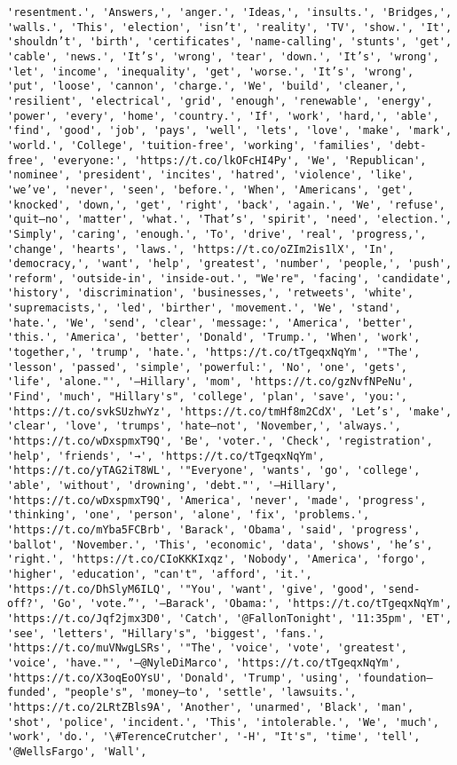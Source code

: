 \documentclass[11pt]{article}
\begin{document}
\begin{Verbatim}[commandchars=\\\{\}]
'resentment.', 'Answers,', 'anger.', 'Ideas,', 'insults.', 'Bridges,', 'walls.', 'This', 'election', 'isn’t', 'reality', 'TV', 'show.', 'It', 'shouldn’t', 'birth', 'certificates', 'name-calling', 'stunts', 'get', 'cable', 'news.', 'It’s', 'wrong', 'tear', 'down.', 'It’s', 'wrong', 'let', 'income', 'inequality', 'get', 'worse.', 'It’s', 'wrong', 'put', 'loose', 'cannon', 'charge.', 'We', 'build', 'cleaner,', 'resilient', 'electrical', 'grid', 'enough', 'renewable', 'energy', 'power', 'every', 'home', 'country.', 'If', 'work', 'hard,', 'able', 'find', 'good', 'job', 'pays', 'well', 'lets', 'love', 'make', 'mark', 'world.', 'College', 'tuition-free', 'working', 'families', 'debt-free', 'everyone:', 'https://t.co/lkOFcHI4Py', 'We', 'Republican', 'nominee', 'president', 'incites', 'hatred', 'violence', 'like', 'we’ve', 'never', 'seen', 'before.', 'When', 'Americans', 'get', 'knocked', 'down,', 'get', 'right', 'back', 'again.', 'We', 'refuse', 'quit—no', 'matter', 'what.', 'That’s', 'spirit', 'need', 'election.', 'Simply', 'caring', 'enough.', 'To', 'drive', 'real', 'progress,', 'change', 'hearts', 'laws.', 'https://t.co/oZIm2is1lX', 'In', 'democracy,', 'want', 'help', 'greatest', 'number', 'people,', 'push', 'reform', 'outside-in', 'inside-out.', "We're", 'facing', 'candidate', 'history', 'discrimination', 'businesses,', 'retweets', 'white', 'supremacists,', 'led', 'birther', 'movement.', 'We', 'stand', 'hate.', 'We', 'send', 'clear', 'message:', 'America', 'better', 'this.', 'America', 'better', 'Donald', 'Trump.', 'When', 'work', 'together,', 'trump', 'hate.', 'https://t.co/tTgeqxNqYm', '"The', 'lesson', 'passed', 'simple', 'powerful:', 'No', 'one', 'gets', 'life', 'alone."', '—Hillary', 'mom', 'https://t.co/gzNvfNPeNu', 'Find', 'much', "Hillary's", 'college', 'plan', 'save', 'you:', 'https://t.co/svkSUzhwYz', 'https://t.co/tmHf8m2CdX', 'Let’s', 'make', 'clear', 'love', 'trumps', 'hate—not', 'November,', 'always.', 'https://t.co/wDxspmxT9Q', 'Be', 'voter.', 'Check', 'registration', 'help', 'friends', '→', 'https://t.co/tTgeqxNqYm', 'https://t.co/yTAG2iT8WL', '"Everyone', 'wants', 'go', 'college', 'able', 'without', 'drowning', 'debt."', '—Hillary', 'https://t.co/wDxspmxT9Q', 'America', 'never', 'made', 'progress', 'thinking', 'one', 'person', 'alone', 'fix', 'problems.', 'https://t.co/mYba5FCBrb', 'Barack', 'Obama', 'said', 'progress', 'ballot', 'November.', 'This', 'economic', 'data', 'shows', 'he’s', 'right.', 'https://t.co/CIoKKKIxqz', 'Nobody', 'America', 'forgo', 'higher', 'education', "can't", 'afford', 'it.', 'https://t.co/DhSlyM6ILQ', '"You', 'want', 'give', 'good', 'send-off?', 'Go', 'vote.”', '—Barack', 'Obama:', 'https://t.co/tTgeqxNqYm', 'https://t.co/Jqf2jmx3D0', 'Catch', '@FallonTonight', '11:35pm', 'ET', 'see', 'letters', "Hillary's", 'biggest', 'fans.', 'https://t.co/muVNwgLSRs', '"The', 'voice', 'vote', 'greatest', 'voice', 'have."', '—@NyleDiMarco', 'https://t.co/tTgeqxNqYm', 'https://t.co/X3oqEoOYsU', 'Donald', 'Trump', 'using', 'foundation—funded', "people's", 'money—to', 'settle', 'lawsuits.', 'https://t.co/2LRtZBls9A', 'Another', 'unarmed', 'Black', 'man', 'shot', 'police', 'incident.', 'This', 'intolerable.', 'We', 'much', 'work', 'do.', '\#TerenceCrutcher', '-H', "It's", 'time', 'tell', '@WellsFargo', 'Wall', 
\end{Verbatim}
\end{document}
